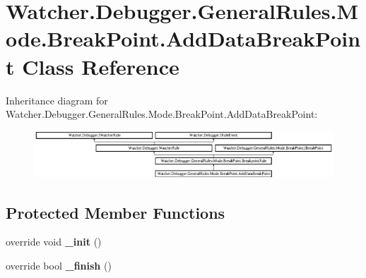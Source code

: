 \hypertarget{class_watcher_1_1_debugger_1_1_general_rules_1_1_mode_1_1_break_point_1_1_add_data_break_point}{\section{Watcher.\+Debugger.\+General\+Rules.\+Mode.\+Break\+Point.\+Add\+Data\+Break\+Point Class Reference}
\label{class_watcher_1_1_debugger_1_1_general_rules_1_1_mode_1_1_break_point_1_1_add_data_break_point}
}
Inheritance diagram for Watcher.\+Debugger.\+General\+Rules.\+Mode.\+Break\+Point.\+Add\+Data\+Break\+Point\+:\begin{figure}[H]
\begin{center}
\leavevmode
\includegraphics[height=1.769352cm]{class_watcher_1_1_debugger_1_1_general_rules_1_1_mode_1_1_break_point_1_1_add_data_break_point}
\end{center}
\end{figure}
\subsection*{Protected Member Functions}
\begin{DoxyCompactItemize}
\item 
\hypertarget{class_watcher_1_1_debugger_1_1_general_rules_1_1_mode_1_1_break_point_1_1_add_data_break_point_a6f1752461b4710c632689b18200d9400}{override void {\bfseries \+\_\+init} ()}\label{class_watcher_1_1_debugger_1_1_general_rules_1_1_mode_1_1_break_point_1_1_add_data_break_point_a6f1752461b4710c632689b18200d9400}

\item 
\hypertarget{class_watcher_1_1_debugger_1_1_general_rules_1_1_mode_1_1_break_point_1_1_add_data_break_point_adb47b756fa328e8b3a4c44a3b17ba56a}{override bool {\bfseries \+\_\+finish} ()}\label{class_watcher_1_1_debugger_1_1_general_rules_1_1_mode_1_1_break_point_1_1_add_data_break_point_adb47b756fa328e8b3a4c44a3b17ba56a}

\end{DoxyCompactItemize}
